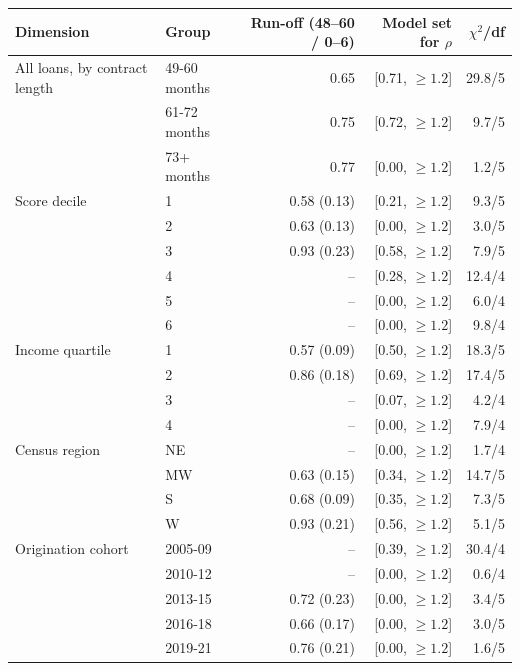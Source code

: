\begin{tabular}{llrrr}
\toprule
Dimension & Group & Run-off (48--60 / 0--6) & Model set for $\rho$ & $\chi^2$/df \\
\midrule
All loans, by contract length & 49-60 months & 0.65 & [0.71, $\ge 1.2$] & 29.8/5 \\
 & 61-72 months & 0.75 & [0.72, $\ge 1.2$] & 9.7/5 \\
 & 73+ months & 0.77 & [0.00, $\ge 1.2$] & 1.2/5 \\
\addlinespace
Score decile & 1 & 0.58 (0.13) & [0.21, $\ge 1.2$] & 9.3/5 \\
 & 2 & 0.63 (0.13) & [0.00, $\ge 1.2$] & 3.0/5 \\
 & 3 & 0.93 (0.23) & [0.58, $\ge 1.2$] & 7.9/5 \\
 & 4 & -- & [0.28, $\ge 1.2$] & 12.4/4 \\
 & 5 & -- & [0.00, $\ge 1.2$] & 6.0/4 \\
 & 6 & -- & [0.00, $\ge 1.2$] & 9.8/4 \\
\addlinespace
Income quartile & 1 & 0.57 (0.09) & [0.50, $\ge 1.2$] & 18.3/5 \\
 & 2 & 0.86 (0.18) & [0.69, $\ge 1.2$] & 17.4/5 \\
 & 3 & -- & [0.07, $\ge 1.2$] & 4.2/4 \\
 & 4 & -- & [0.00, $\ge 1.2$] & 7.9/4 \\
\addlinespace
Census region & NE & -- & [0.00, $\ge 1.2$] & 1.7/4 \\
 & MW & 0.63 (0.15) & [0.34, $\ge 1.2$] & 14.7/5 \\
 & S & 0.68 (0.09) & [0.35, $\ge 1.2$] & 7.3/5 \\
 & W & 0.93 (0.21) & [0.56, $\ge 1.2$] & 5.1/5 \\
\addlinespace
Origination cohort & 2005-09 & -- & [0.39, $\ge 1.2$] & 30.4/4 \\
 & 2010-12 & -- & [0.00, $\ge 1.2$] & 0.6/4 \\
 & 2013-15 & 0.72 (0.23) & [0.00, $\ge 1.2$] & 3.4/5 \\
 & 2016-18 & 0.66 (0.17) & [0.00, $\ge 1.2$] & 3.0/5 \\
 & 2019-21 & 0.76 (0.21) & [0.00, $\ge 1.2$] & 1.6/5 \\
\bottomrule
\end{tabular}
